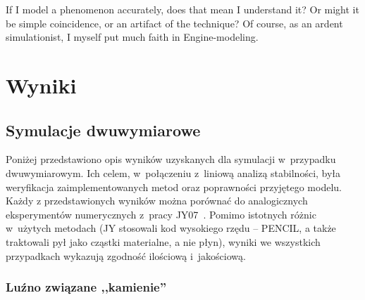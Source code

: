\begin{savequote}[75mm]
   If I model a phenomenon accurately, does that mean I understand it? Or might it be simple coincidence, or an artifact
   of the technique? Of course, as an ardent simulationist, I myself put much faith in Engine-modeling.
\end{savequote}

\chapter{Wyniki}



\section{Symulacje dwuwymiarowe}
Poniżej przedstawiono opis wyników uzyskanych dla symulacji w~przypadku
dwuwymiarowym. Ich celem, w~połączeniu z~liniową analizą stabilności, była
weryfikacja zaimplementowanych metod oraz poprawności przyjętego modelu. Każdy z
przedstawionych wyników można porównać do analogicznych eksperymentów
numerycznych z~pracy JY07~\cite{JY07}. Pomimo istotnych różnic w~użytych
metodach (JY stosowali kod wysokiego rzędu -- PENCIL, a także traktowali pył
jako cząstki materialne, a nie płyn), wyniki we wszystkich przypadkach wykazują
zgodność ilościową i~jakościową.

\subsection{Luźno związane ,,kamienie''}%


